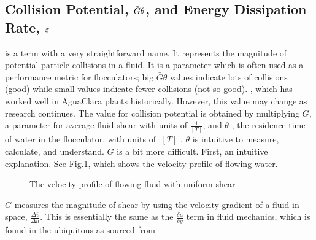 \documentclass[letterpaper,10pt,english]{sphinxmanual}
\begin{document}
\subsection{Collision Potential, \protect\(\bar G \theta\protect\), and Energy Dissipation Rate, \protect\(\varepsilon\protect\)}
\label{\detokenize{Flocculation/Floc_Design:collision-potential-and-energy-dissipation-rate}}
 is a term with a very straightforward name. It represents the magnitude of potential particle collisions in a fluid. It is a  parameter which is often used as a performance metric for flocculators; big \(\bar G \theta\) values indicate lots of collisions (good) while small values indicate fewer collisions (not so good). , which has worked well in AguaClara plants historically. However, this value may change as research continues. The value for collision potential is obtained by multiplying \(\bar G\), a parameter for average fluid shear with units of \(\frac{1}{[T]}\), and \(\theta\) , the residence time of water in the flocculator, with units of :\([T]\) . \(\theta\) is intuitive to measure, calculate, and understand. \(\bar G\) is a bit more difficult. First, an intuitive explanation. See \hyperref[\detokenize{Flocculation/Floc_Design:figure-g-velocity-profile}]{Fig.\@ \ref{\detokenize{Flocculation/Floc_Design:figure-g-velocity-profile}}}, which shows the velocity profile of flowing water.

\begin{figure}[htbp]
\centering
\capstart

\noindent{}
\caption{The velocity profile of flowing fluid with uniform shear}\label{\detokenize{Flocculation/Floc_Design:id4}}\label{\detokenize{Flocculation/Floc_Design:figure-g-velocity-profile}}\end{figure}

\(G\) measures the magnitude of shear by using the velocity gradient of a fluid in space, \(\frac{\Delta \bar v}{\Delta h}\). This is essentially the same as the \(\frac{\delta u}{\delta y}\) term in fluid mechanics, which is found in the ubiquitous  as sourced from 
\end{document}
